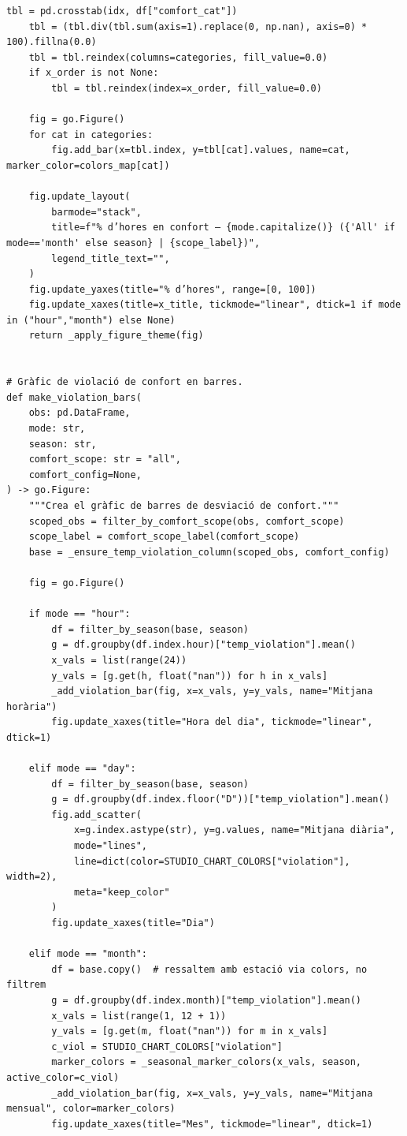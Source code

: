 \documentclass[10pt,a4paper]{article}
\begin{document}
\begin{lstlisting}[style=studioPython,caption={backend/grafics/comfort.py},label={lst:backend-grafics-comfort-py}]
    tbl = pd.crosstab(idx, df["comfort_cat"])
    tbl = (tbl.div(tbl.sum(axis=1).replace(0, np.nan), axis=0) * 100).fillna(0.0)
    tbl = tbl.reindex(columns=categories, fill_value=0.0)
    if x_order is not None:
        tbl = tbl.reindex(index=x_order, fill_value=0.0)

    fig = go.Figure()
    for cat in categories:
        fig.add_bar(x=tbl.index, y=tbl[cat].values, name=cat, marker_color=colors_map[cat])

    fig.update_layout(
        barmode="stack",
        title=f"% d’hores en confort – {mode.capitalize()} ({'All' if mode=='month' else season} | {scope_label})",
        legend_title_text="",
    )
    fig.update_yaxes(title="% d’hores", range=[0, 100])
    fig.update_xaxes(title=x_title, tickmode="linear", dtick=1 if mode in ("hour","month") else None)
    return _apply_figure_theme(fig)


# Gràfic de violació de confort en barres.
def make_violation_bars(
    obs: pd.DataFrame,
    mode: str,
    season: str,
    comfort_scope: str = "all",
    comfort_config=None,
) -> go.Figure:
    """Crea el gràfic de barres de desviació de confort."""
    scoped_obs = filter_by_comfort_scope(obs, comfort_scope)
    scope_label = comfort_scope_label(comfort_scope)
    base = _ensure_temp_violation_column(scoped_obs, comfort_config)

    fig = go.Figure()

    if mode == "hour":
        df = filter_by_season(base, season)
        g = df.groupby(df.index.hour)["temp_violation"].mean()
        x_vals = list(range(24))
        y_vals = [g.get(h, float("nan")) for h in x_vals]
        _add_violation_bar(fig, x=x_vals, y=y_vals, name="Mitjana horària")
        fig.update_xaxes(title="Hora del dia", tickmode="linear", dtick=1)

    elif mode == "day":
        df = filter_by_season(base, season)
        g = df.groupby(df.index.floor("D"))["temp_violation"].mean()
        fig.add_scatter(
            x=g.index.astype(str), y=g.values, name="Mitjana diària",
            mode="lines",
            line=dict(color=STUDIO_CHART_COLORS["violation"], width=2),
            meta="keep_color"
        )
        fig.update_xaxes(title="Dia")

    elif mode == "month":
        df = base.copy()  # ressaltem amb estació via colors, no filtrem
        g = df.groupby(df.index.month)["temp_violation"].mean()
        x_vals = list(range(1, 12 + 1))
        y_vals = [g.get(m, float("nan")) for m in x_vals]
        c_viol = STUDIO_CHART_COLORS["violation"]
        marker_colors = _seasonal_marker_colors(x_vals, season, active_color=c_viol)
        _add_violation_bar(fig, x=x_vals, y=y_vals, name="Mitjana mensual", color=marker_colors)
        fig.update_xaxes(title="Mes", tickmode="linear", dtick=1)


\end{lstlisting}
\end{document}
